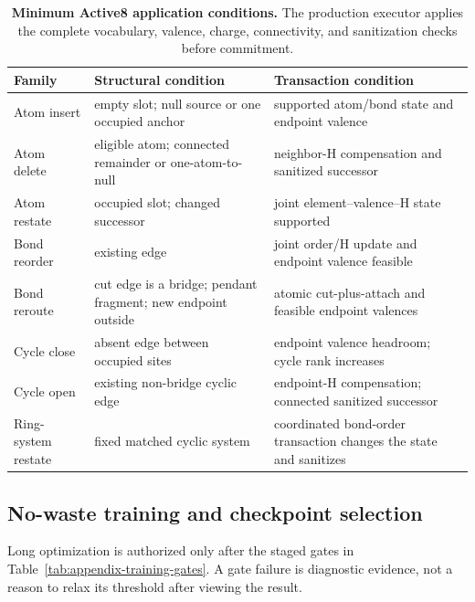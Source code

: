 \begin{table}[htbp]
  \centering
  \caption{\textbf{Minimum Active8 application conditions.} The production
  executor applies the complete vocabulary, valence, charge, connectivity, and
  sanitization checks before commitment.}
  \label{tab:appendix-operator-conditions}
  \small
  \begin{tabularx}{\linewidth}{@{}lYY@{}}
    \toprule
    Family & Structural condition & Transaction condition \\
    \midrule
    Atom insert & empty slot; null source or one occupied anchor &
    supported atom/bond state and endpoint valence \\
    Atom delete & eligible atom; connected remainder or one-atom-to-null &
    neighbor-H compensation and sanitized successor \\
    Atom restate & occupied slot; changed successor &
    joint element--valence--H state supported \\
    Bond reorder & existing edge &
    joint order/H update and endpoint valence feasible \\
    Bond reroute & cut edge is a bridge; pendant fragment; new endpoint outside &
    atomic cut-plus-attach and feasible endpoint valences \\
    Cycle close & absent edge between occupied sites &
    endpoint valence headroom; cycle rank increases \\
    Cycle open & existing non-bridge cyclic edge &
    endpoint-H compensation; connected sanitized successor \\
    Ring-system restate & fixed matched cyclic system &
    coordinated bond-order transaction changes the state and sanitizes \\
    \bottomrule
  \end{tabularx}
\end{table}

\subsection{No-waste training and checkpoint selection}
\label{app:training-gates}

Long optimization is authorized only after the staged gates in
Table~\ref{tab:appendix-training-gates}.  A gate failure is diagnostic evidence,
not a reason to relax its threshold after viewing the result.

